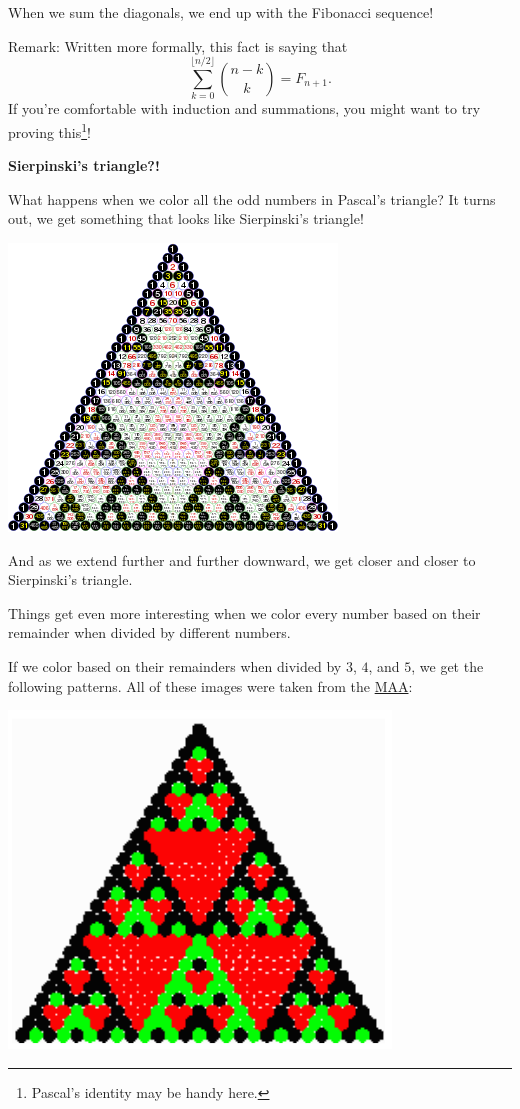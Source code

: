 \documentclass{article}
\begin{document}
When we sum the diagonals, we end up with the Fibonacci sequence! 

Remark: Written more formally, this fact is saying that
\[\sum_{k=0}^{\lfloor n/2\rfloor}\binom{n-k}k=F_{n+1}.\]
If you're comfortable with induction and summations, you might want to try proving this\footnote{Pascal's identity may be handy here.}!


\textbf{Sierpinski's triangle?!}

What happens when we color all the odd numbers in Pascal's triangle? It turns out, we get something that looks like Sierpinski's triangle! 

\begin{center}
	\includegraphics[scale=0.45]{images/pascal2.png}
\end{center}

And as we extend further and further downward, we get closer and closer to Sierpinski's triangle.

Things get even more interesting when we color every number based on their remainder when divided by different numbers. 

If we color based on their remainders when divided by $3$, $4$, and $5$, we get the following patterns. All of these images were taken from the \href{https://www.maa.org/press/periodicals/loci/joma/patterns-in-pascals-triangle-with-a-twist-first-twist-what-is-it}{MAA}:


\begin{center}
	\includegraphics[width=4in,scale=0.35]{images/pascal3.png}
\end{center}
\end{document}
